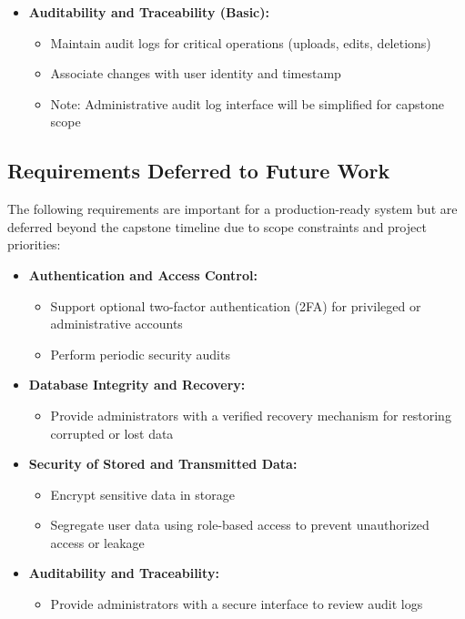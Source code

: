 \documentclass{article}
\begin{document}
\begin{itemize}
    \item \textbf{Auditability and Traceability (Basic):}
    \begin{itemize}
        \item Maintain audit logs for critical operations (uploads, edits, deletions)
        \item Associate changes with user identity and timestamp
        \item Note: Administrative audit log interface will be simplified for capstone scope
    \end{itemize}
\end{itemize}

\subsection{Requirements Deferred to Future Work}

The following requirements are important for a production-ready system but are deferred beyond the capstone timeline due to scope constraints and project priorities:

\begin{itemize}
    \item \textbf{Authentication and Access Control:}
    \begin{itemize}
        \item Support optional two-factor authentication (2FA) for privileged or administrative accounts
        \item Perform periodic security audits
    \end{itemize}

    \item \textbf{Database Integrity and Recovery:}
    \begin{itemize}
        \item Provide administrators with a verified recovery mechanism for restoring corrupted or lost data
    \end{itemize}

    \item \textbf{Security of Stored and Transmitted Data:}
    \begin{itemize}
        \item Encrypt sensitive data in storage
        \item Segregate user data using role-based access to prevent unauthorized access or leakage
    \end{itemize}

    \item \textbf{Auditability and Traceability:}
    \begin{itemize}
        \item Provide administrators with a secure interface to review audit logs
    \end{itemize}
\end{itemize}
\end{document}
